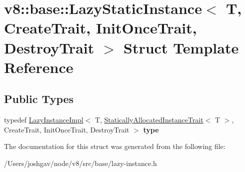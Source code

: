 \hypertarget{structv8_1_1base_1_1_lazy_static_instance}{}\section{v8\+:\+:base\+:\+:Lazy\+Static\+Instance$<$ T, Create\+Trait, Init\+Once\+Trait, Destroy\+Trait $>$ Struct Template Reference}
\label{structv8_1_1base_1_1_lazy_static_instance}
\subsection*{Public Types}
\begin{DoxyCompactItemize}
\item 
typedef \hyperlink{structv8_1_1base_1_1_lazy_instance_impl}{Lazy\+Instance\+Impl}$<$ T, \hyperlink{structv8_1_1base_1_1_statically_allocated_instance_trait}{Statically\+Allocated\+Instance\+Trait}$<$ T $>$, Create\+Trait, Init\+Once\+Trait, Destroy\+Trait $>$ {\bfseries type}\hypertarget{structv8_1_1base_1_1_lazy_static_instance_ac7d85178e95333cf30b45a2185e7d701}{}\label{structv8_1_1base_1_1_lazy_static_instance_ac7d85178e95333cf30b45a2185e7d701}

\end{DoxyCompactItemize}


The documentation for this struct was generated from the following file\+:\begin{DoxyCompactItemize}
\item 
/\+Users/joshgav/node/v8/src/base/lazy-\/instance.\+h\end{DoxyCompactItemize}
